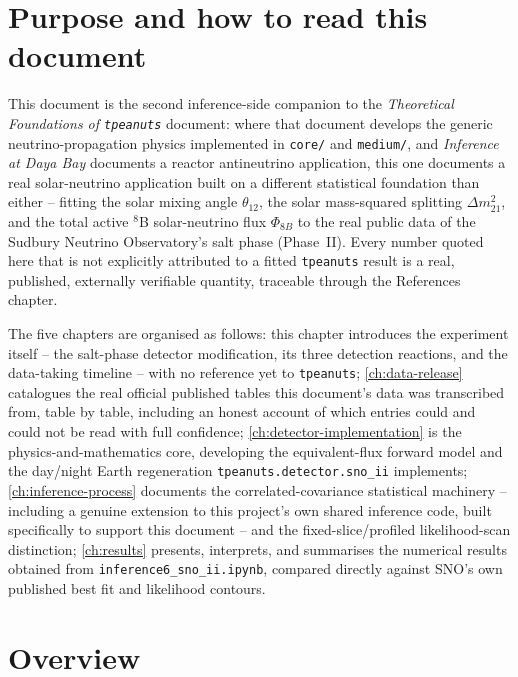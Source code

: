 \label{ch:introduction}

\section{Purpose and how to read this document}

This document is the second inference-side companion to the \emph{Theoretical
Foundations of \texttt{tpeanuts}} document: where that document develops the
generic neutrino-propagation physics implemented in \texttt{core/} and
\texttt{medium/}, and \emph{Inference at Daya Bay} documents a reactor
antineutrino application, this one documents a real solar-neutrino
application built on a different statistical foundation than either --
fitting the solar mixing angle $\theta_{12}$, the solar mass-squared
splitting $\Delta m^2_{21}$, and the total active $^8$B solar-neutrino flux
$\Phi_{8B}$ to the real public data of the Sudbury Neutrino Observatory's
salt phase (Phase~II). Every number quoted here that is not explicitly
attributed to a fitted \texttt{tpeanuts} result is a real, published,
externally verifiable quantity, traceable through the References chapter.

The five chapters are organised as follows: this chapter introduces the
experiment itself -- the salt-phase detector modification, its three
detection reactions, and the data-taking timeline -- with no reference yet to
\texttt{tpeanuts}; \cref{ch:data-release} catalogues the real official
published tables this document's data was transcribed from, table by table,
including an honest account of which entries could and could not be read with
full confidence; \cref{ch:detector-implementation} is the physics-and-mathematics
core, developing the equivalent-flux forward model and the day/night Earth
regeneration \texttt{tpeanuts.detector.sno\_ii} implements;
\cref{ch:inference-process} documents the correlated-covariance statistical
machinery -- including a genuine extension to this project's own shared
inference code, built specifically to support this document -- and the
fixed-slice/profiled likelihood-scan distinction; \cref{ch:results} presents,
interprets, and summarises the numerical results obtained from
\texttt{inference6\_sno\_ii.ipynb}, compared directly against SNO's own
published best fit and likelihood contours.

\section{Overview}

